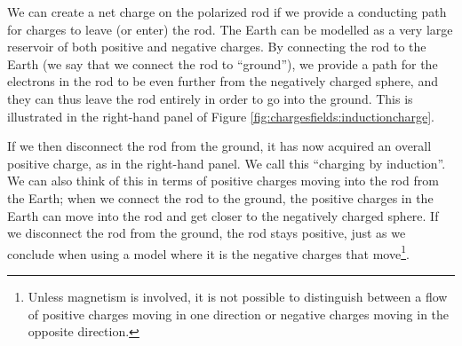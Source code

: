 We can create a net charge on the polarized rod if we provide a conducting path for charges to leave (or enter) the rod. The Earth can be modelled as a very large reservoir of both positive and negative charges. By connecting the rod to the Earth (we say that we connect the rod to ``ground''), we provide a path for the electrons in the rod to be even further from the negatively charged sphere, and they can thus leave the rod entirely in order to go into the ground. This is illustrated in the right-hand panel of Figure \ref{fig:chargesfields:inductioncharge}.

If we then disconnect the rod from the ground, it has now acquired an overall positive charge, as in the right-hand panel. We call this ``charging by induction''. We can also think of this in terms of positive charges moving into the rod from the Earth; when we connect the rod to the ground, the positive charges in the Earth can move into the rod and get closer to the negatively charged sphere. If we disconnect the rod from the ground, the rod stays positive, just as we conclude when using a model where it is the negative charges that move\footnote{Unless magnetism is involved, it is not possible to distinguish between a flow of positive charges moving in one direction or negative charges moving in the opposite direction.}.


